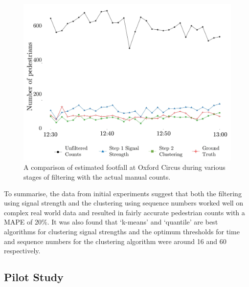 \begin{figure}
  \includegraphics[trim={3 3 3 3},clip]{images/processing-oxst-results.jpg}
  \caption{A comparison of estimated footfall at Oxford Circus during various stages of filtering with the actual manual counts.}
  \label{figure:processing:oxst:results}
\end{figure}

To summarise, the data from initial experiments suggest that both the filtering using signal strength and the clustering using sequence numbers worked well on complex real world data and resulted in fairly accurate pedestrian counts with a MAPE of 20\%.
It was also found that `k-means' and `quantile' are best algorithms for clustering signal strengths and the optimum thresholds for time and sequence numbers for the clustering algorithm were around 16 and 60 respectively.

\subsection{Pilot Study}

